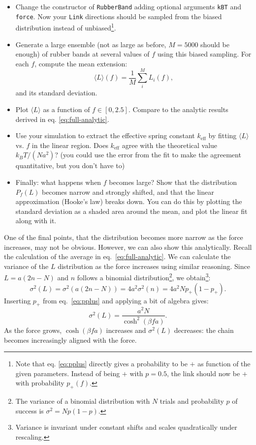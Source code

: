 \documentclass[11pt]{article}
\begin{document}
\begin{itemize}
  \item Change the constructor of \texttt{RubberBand} adding optional arguments \texttt{kBT} and \texttt{force}. Now your \texttt{Link} directions should be sampled from the biased distribution instead of unbiased\footnote{Note that eq. \eqref{eq:pplus} directly gives a probability to be $+$ as function of the given parameters. Instead of being $+$ with $p=0.5$, the link should now be $+$ with probability $p_+(f)$.}.
  \item Generate a large ensemble (not as large as before, $M=5000$ should be enough) of rubber bands at several values of $f$ using this biased sampling. For each $f$, compute the mean extension:
  \[\langle L \rangle(f) = \frac{1}{M}\sum^M_i L_i(f),\]
  and its standard deviation.
  \item Plot $\langle L \rangle$ as a function of $f \in [0,2.5]$. Compare to the analytic results derived in eq. \eqref{eq:full-analytic}.
  \item Use your simulation to extract the effective spring constant $k_\text{eff}$ by fitting $\langle L \rangle$ vs. $f$ in the linear region. Does $k_\text{eff}$ agree with the theoretical value $k_B T/(Na^2)$? (you could use the error from the fit to make the agreement quantitative, but you don't have to)
  \item Finally: what happens when $f$ becomes large? Show that the distribution $P_f(L)$ becomes narrow and strongly shifted, and that the linear approximation (Hooke's law) breaks down. You can do this by plotting the standard deviation as a shaded area around the mean, and plot the linear fit along with it.
\end{itemize}

One of the final points, that the distribution becomes more narrow as the force increases, may not be obvious.
However, we can also show this analytically. Recall the calculation of the average in eq.~\eqref{eq:full-analytic}.
We can calculate the variance of the $L$ distribution as the force increases using similar reasoning.
Since $L = a(2n - N)$ and $n$ follows a binomial distribution\footnote{
The variance of a binomial distribution with $N$ trials and probability $p$ of success is $\sigma^2 = Np(1-p)$.
}, we obtain\footnote{
Variance is invariant under constant shifts and scales quadratically under rescaling.
}:
\begin{equation}
  \sigma^2(L) = \sigma^2 \left(a(2n - N)\right)
  = 4a^2 \sigma^2(n)
  = 4a^2N p_+(1-p_+).
\end{equation}
Inserting $p_+$ from eq.~\eqref{eq:pplus} and applying a bit of algebra gives:
\begin{equation}
\label{eq:sigma2l}
  \sigma^2(L) = \frac{a^2 N}{\cosh^2(\beta f a)}.
\end{equation}
As the force grows, $\cosh(\beta f a)$ increases and $\sigma^2(L)$ decreases: the chain becomes increasingly aligned with the force.
\end{document}

